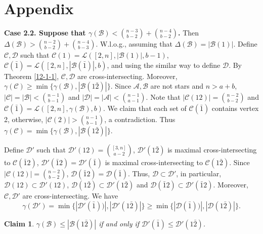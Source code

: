 \documentclass[11pt]{article}
\newtheorem{claim}[theorem]{Claim}
\begin{document}
\section{Appendix}
{\bf Case 2.2. Suppose that 
$\gamma(\mathcal{B})< {n-3\choose b-2}+{n-4\choose b-2}$.} Then $\Delta(\mathcal{B})> {n-2\choose b-2}+{n-4\choose b-3}$. W.l.o.g., assuming that $\Delta(\mathcal{B})=|\mathcal{B}(1)|$. Define $\mathcal{C}, \mathcal{D}$ such that $\mathcal{C}(1)=\mathcal{L}([2,n],|\mathcal{B}(1)|, b-1)$, $\mathcal{C}(\bar{1})=\mathcal{L}([2,n],|\mathcal{B}(\bar{1})|, b)$, and using the similar way to define $\mathcal{D}$. By Theorem \ref{12-1-1}, $\mathcal{C}, \mathcal{D}$ are cross-intersecting. Moreover, $\gamma(\mathcal{C})\ge \min \{\gamma(\mathcal{B}), |\mathcal{B}(1\bar{2})|\}$. Since $\mathcal{A}, \mathcal{B}$ are not stars and $n>a+b$, $|\mathcal{C}|=|\mathcal{B}|<{n-1\choose b-1}$ and $|\mathcal{D}|=|\mathcal{A}|<{n-1\choose a-1}$. Note that  $|\mathcal{C}(12)|={n-2\choose b-2}$ and $\mathcal{C}(\bar{1})=\mathcal{L}([2, n], \gamma(\mathcal{B}), b)$. 
We claim that each set of $\mathcal{C}(\bar{1})$ contains vertex 2, otherwise,  $|\mathcal{C}(2)|> {n-1\choose b-1}$, a contradiction. Thus $\gamma(\mathcal{C})= \min \{\gamma(\mathcal{B}), |\mathcal{B}(1\bar{2})|\}$.



Define $\mathcal{D}'$ such that $\mathcal{D}'(12)={[3,n]\choose a-2}$, $\mathcal{D}'(1\bar{2})$ is maximal cross-intersecting to $\mathcal{C}(\bar{1}2)$, $\mathcal{D}'(\bar{1}2)=\mathcal{D}'(\bar{1})$ is maximal cross-intersecting to $\mathcal{C}(1\bar{2})$. 
Since $|\mathcal{C}(12)|={n-2\choose b-2}$, $\mathcal{D}(\bar{1}2)=\mathcal{D}(\bar{1})$. Thus, $\mathcal{D}\subset \mathcal{D}'$, in particular, $\mathcal{D}(12)\subset \mathcal{D}'(12)$, $\mathcal{D}(1\bar{2})\subset \mathcal{D}'(1\bar{2})$  and $\mathcal{D}(\bar{1}2)\subset \mathcal{D}'(\bar{1}2)$. Moreover, 
 $\mathcal{C}, \mathcal{D}'$ are cross-intersecting. We have 
$$\gamma(\mathcal{D}')= \min \{ |\mathcal{D}'(\bar{1}))|, |\mathcal{D}'(1\bar{2})|\}\ge \min \{ |\mathcal{D}(\bar{1}))|, |\mathcal{D}(1\bar{2})|\}.$$%

\begin{claim}\label{12-1-6}
 $\gamma(\mathcal{B})\le |\mathcal{B}(1\bar{2})|$ if and only if $\mathcal{D}'(\bar{1})\le \mathcal{D}'(1\bar{2})$.
\end{claim}
\end{document}
